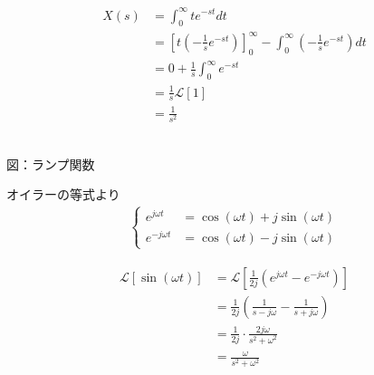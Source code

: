 \documentclass[a4paper,12pt]{article}
\begin{document}
\begin{tcolorbox}[title={[4] ランプ関数 \( x(t) = t \) をラプラス変換せよ．}]

  \begin{minipage}{0.6\linewidth}
  \begin{align*}
  X(s) &= \int_0^{\infty} te^{-st} dt \\
  &=\left[ t \left( - \frac{1}{s}e^{-st} \right) \right]_0^{\infty} - 
  \int_0^{\infty} \left( -\frac{1}{s}e^{-st} \right) dt \\
  &=0 + \frac{1}{s} \int_{0}^{\infty} e^{-st} \\
  &=\frac{1}{s} \mathcal{L} \left[ 1 \right] \\
  &=\frac{1}{s^2}
  \end{align*}
  \end{minipage}
  \hfill
  \begin{minipage}{0.35\linewidth}
  \begin{center}
      \\
      図：ランプ関数
  \end{center}
  \end{minipage}
  
\end{tcolorbox}
\begin{tcolorbox}[title={[5] 正弦波関数 \( x(t) = \sin(\omega t) \) をラプラス変換せよ．}]
  
  \quad オイラーの等式より
  \begin{align*}
  \left\{
      \begin{aligned}
          e^{j \omega t} &= \cos(\omega t) + j \sin(\omega t) \\
          e^{-j \omega t} &= \cos(\omega t) - j \sin(\omega t)
      \end{aligned}
  \right.
  \end{align*}
  
  \vspace{-2mm}
  
  \begin{align*}
  \mathcal{L} \left[ \sin(\omega t) \right] &=
  \mathcal{L} \left[ \frac{1}{2j}\left( e^{j \omega t} - e^{-j \omega t} \right) \right] \\
  &=\frac{1}{2j} \left( \frac{1}{s-j \omega} - \frac{1}{s + j \omega} \right) \\
  &=\frac{1}{2j} \cdot \frac{2j\omega}{s^2 + \omega^2} \\
  &=\frac{\omega}{s^2 + \omega^2}
  \end{align*}
  
\end{tcolorbox}
\end{document}
